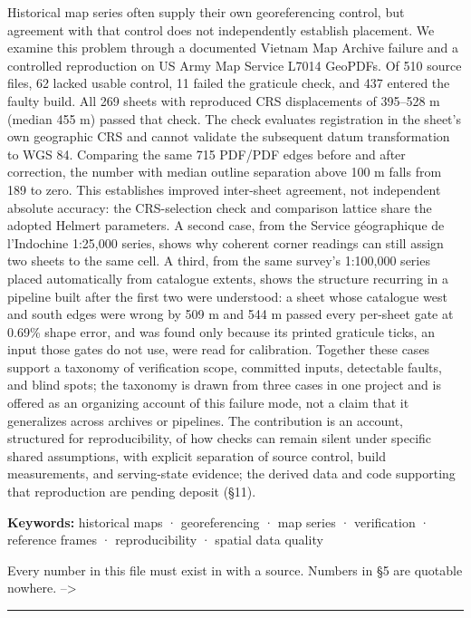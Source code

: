 \documentclass[11pt,a4paper]{article}
\begin{document}
Historical map series often supply their own georeferencing control, but agreement with that control does not independently establish placement. We examine this problem through a documented Vietnam Map Archive failure and a controlled reproduction on US Army Map Service L7014 GeoPDFs. Of 510 source files, 62 lacked usable control, 11 failed the graticule check, and 437 entered the faulty build. All 269 sheets with reproduced CRS displacements of 395–528 m (median 455 m) passed that check. The check evaluates registration in the sheet's own geographic CRS and cannot validate the subsequent datum transformation to WGS 84. Comparing the same 715 PDF/PDF edges before and after correction, the number with median outline separation above 100 m falls from 189 to zero. This establishes improved inter-sheet agreement, not independent absolute accuracy: the CRS-selection check and comparison lattice share the adopted Helmert parameters. A second case, from the Service géographique de l'Indochine 1:25,000 series, shows why coherent corner readings can still assign two sheets to the same cell. A third, from the same survey's 1:100,000 series placed automatically from catalogue extents, shows the structure recurring in a pipeline built after the first two were understood: a sheet whose catalogue west and south edges were wrong by 509 m and 544 m passed every per-sheet gate at 0.69\% shape error, and was found only because its printed graticule ticks, an input those gates do not use, were read for calibration. Together these cases support a taxonomy of verification scope, committed inputs, detectable faults, and blind spots; the taxonomy is drawn from three cases in one project and is offered as an organizing account of this failure mode, not a claim that it generalizes across archives or pipelines. The contribution is an account, structured for reproducibility, of how checks can remain silent under specific shared assumptions, with explicit separation of source control, build measurements, and serving-state evidence; the derived data and code supporting that reproduction are pending deposit (§11).

\textbf{Keywords:} historical maps · georeferencing · map series · verification · reference frames · reproducibility · spatial data quality

Every number in this file must exist in \texttt{} with a source. Numbers in \texttt{} §5 are quotable nowhere. -->

\bigskip\hrule\bigskip
\end{document}
